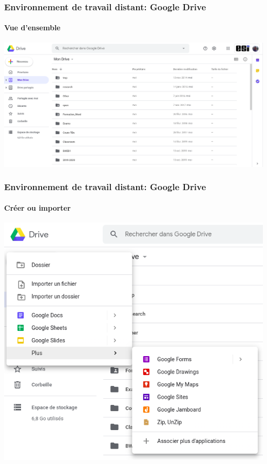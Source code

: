 \documentclass[xcolor=table]{beamer}
\begin{document}
\begin{frame}
\frametitle{Environnement de travail distant: Google Drive}
\framesubtitle{Vue d'ensemble}

\begin{center}
	\includegraphics[width=
	\textwidth]{../img/Bweb01-environnement/drive.png}
\end{center}

\end{frame}

\begin{frame}
\frametitle{Environnement de travail distant: Google Drive}
\framesubtitle{Créer ou importer}

\begin{center}
	\includegraphics[height=
	.8\textheight]{../img/Bweb01-environnement/drive-new.png}
\end{center}

\end{frame}
\end{document}
